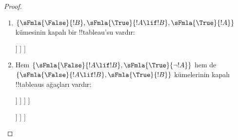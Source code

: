 \begin{proof}
  \begin{enumerate}
    \item $\{\sFmla{\False}{!B}, \sFmla{\True}{!A \lif !B},
      \sFmla{\True}{!A}\}$ kümesinin kapalı bir !!{tableau}'su vardır:
      \begin{oltableau}
        [\sFmla{\False}{\formula{B}}, just=\TAss
          [\sFmla{\True}{\formula{A} \lif \formula{B}}, just=\TAss
            [\sFmla{\True}{\formula{A}}, just=\TAss
              [\sFmla{\False}{\formula{A}}, just = {\TRule{\True}{\lif}[2]}, close]
              [\sFmla{\True}{\formula{B}}, just = {\TRule{\True}{\lif}[2]}, close]
            ]
          ]
        ]
      \end{oltableau}
    \item Hem $\{\sFmla{\False}{!A \lif !B},
      \sFmla{\True}{\lnot !A}\}$ hem de $\{\sFmla{\False}{!A \lif !B},
      \sFmla{\True}{!B}\}$ kümelerinin kapalı !!{tableau}s ağaçları vardır:
      \begin{oltableau}
        [\sFmla{\False}{\formula{A} \lif \formula{B}}, just = \TAss
          [\sFmla{\True}{\lnot \formula{A}}, just = \TAss
            [\sFmla{\True}{\formula{A}}, just = {\TRule{\False}{\lif}[1]}
              [\sFmla{\False}{\formula{B}}, just = {\TRule{\False}{\lif}[1]}
                [\sFmla{\False}{\formula{A}}, just = {\TRule{\True}{\lnot}[2]}, close]
              ]
            ]
          ]
        ]
      \end{oltableau}
      \begin{oltableau}
        [\sFmla{\False}{\formula{A} \lif \formula{B}}, just = \TAss
          [\sFmla{\True}{\formula{B}}, just = \TAss
            [\sFmla{\True}{\formula{A}}, just = {\TRule{\False}{\lif}[1]}
              [\sFmla{\False}{\formula{B}}, just = {\TRule{\False}{\lif}[1]},close
              ]
            ]
          ]
        ]
      \end{oltableau}
  \end{enumerate}
\end{proof}

